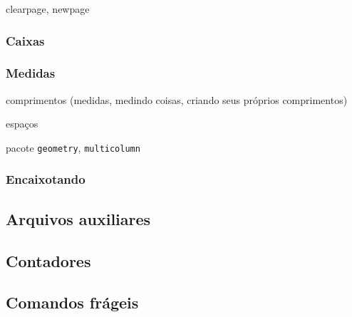 clearpage, newpage

\subsubsection{Caixas}

\subsubsection{Medidas}

comprimentos  (medidas, medindo coisas, criando seus próprios
comprimentos)

espaços

pacote \verb!geometry!, \verb!multicolumn!

\subsubsection{Encaixotando}

\subsection{Arquivos auxiliares}

\subsection{Contadores}\label{sec:contadores}

\subsection{Comandos frágeis}
